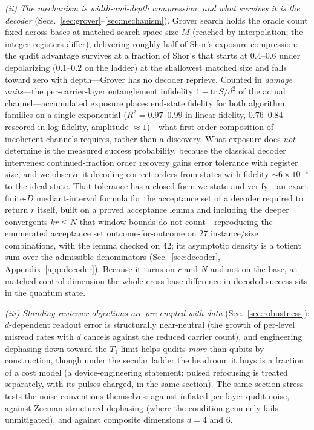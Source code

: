 \documentclass[aps,pra,reprint,superscriptaddress,nofootinbib,floatfix]{revtex4-2}
\begin{document}
\emph{(ii) The mechanism is width-and-depth compression, and what
survives it is the decoder}
(Secs.~\ref{sec:grover}--\ref{sec:mechanism}). Grover search holds the
oracle count fixed across bases at matched search-space size $M$
(reached by interpolation; the integer registers differ),
delivering roughly half of Shor's
exposure compression: the qudit advantage survives at a fraction of
Shor's that starts at $0.4$--$0.6$ under depolarizing
($0.1$--$0.2$ on the ladder) at the shallowest matched size and
falls toward zero with depth---Grover has no decoder reprieve. Counted in \emph{damage
units}---the per-carrier-layer entanglement infidelity $1-\mathrm{tr}\,
S/d^2$ of the actual channel---accumulated exposure places end-state
fidelity for both algorithm families on a single exponential
($R^2=0.97$--$0.99$ in linear fidelity, $0.76$--$0.84$ rescored in log
fidelity, amplitude ${\approx}1$)---what first-order
composition of incoherent channels requires, rather than a discovery.
What exposure does \emph{not}
determine is the measured success probability, because the classical
decoder intervenes: continued-fraction order recovery gains error
tolerance with register size, and we observe it decoding correct orders
from states with fidelity ${\sim}6\times10^{-4}$ to the ideal state. That
tolerance has a closed form we state and verify---an exact finite-$D$
mediant-interval formula for the acceptance set of a decoder required
to return $r$ itself, built on a proved acceptance lemma and including
the deeper convergents $kr\le N$ that window bounds do not
count---reproducing the enumerated acceptance set outcome-for-outcome
on 27 instance/size combinations, with the lemma checked on 42; its
asymptotic density is a totient sum over the admissible denominators
(Sec.~\ref{sec:decoder}, Appendix~\ref{app:decoder}). Because it turns
on $r$ and $N$ and not on the base, at matched control dimension the
whole cross-base difference in decoded success sits in the quantum
state.

\emph{(iii) Standing reviewer objections are pre-empted with data}
(Sec.~\ref{sec:robustness}): $d$-dependent readout error is structurally
near-neutral (the growth of per-level misread rates with $d$ cancels
against the reduced carrier count), and engineering dephasing down
toward the $T_1$ limit helps qudits
\emph{more} than qubits by construction, though under the secular
ladder the headroom it buys is a fraction of a cost model (a
device-engineering statement; pulsed refocusing is treated
separately, with its pulses charged, in the same section). The same
section stress-tests the noise conventions themselves: against
inflated per-layer qudit noise, against Zeeman-structured dephasing
(where the condition genuinely fails unmitigated), and against
composite dimensions $d=4$ and $6$.
\end{document}
